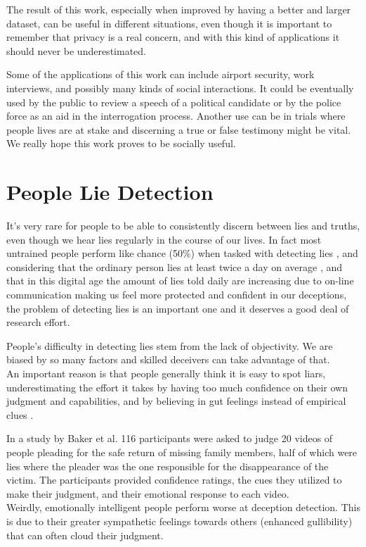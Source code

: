 The result of this work, especially when improved by having a better and larger dataset, can be useful in different situations, even though it is important to remember that privacy is a real concern, and with this kind of applications it should never be underestimated.

Some of the applications of this work can include airport security, work interviews, and possibly many kinds of social interactions. It could be eventually used by the public to review a speech of a political candidate or by the police force as an aid in the interrogation process. Another use can be in trials where people lives are at stake and discerning a true or false testimony might be vital. We really hope this work proves to be socially useful.

\clearpage

\section{People Lie Detection} \label{pplLieDet}
It's very rare for people to be able to consistently discern between lies and truths, even though we hear lies regularly in the course of our lives. In fact most untrained people perform like chance (50\%) when tasked with detecting lies \cite{Porter2012SecretsAL}, and considering that the ordinary person lies at least twice a day on average \cite{LyingEverydayLife}, and that in this digital age the amount of lies told daily are increasing \cite{DigitalDeception} due to on-line communication making us feel more protected and confident in our deceptions, the problem of detecting lies is an important one and it deserves a good deal of research effort. 

People's difficulty in detecting lies stem from the lack of objectivity. We are biased by so many factors and skilled deceivers can take advantage of that. \\
An important reason is that people generally think it is easy to spot liars, underestimating the effort it takes by having too much confidence on their own judgment and capabilities, and by believing in gut feelings instead of empirical clues \cite{VrijDLD}. 

In a study by Baker et al.  \cite{EmotionallyIntelligent} 116 participants were asked to judge 20 videos of people pleading for the safe return of missing family members, half of which were lies where the pleader was the one responsible for the disappearance of the victim. The participants provided confidence ratings, the cues they utilized to make their judgment, and their emotional response to each video.\\
Weirdly, emotionally intelligent people perform worse at deception detection. This is due to their greater sympathetic feelings towards others (enhanced gullibility) that can often cloud their judgment.

